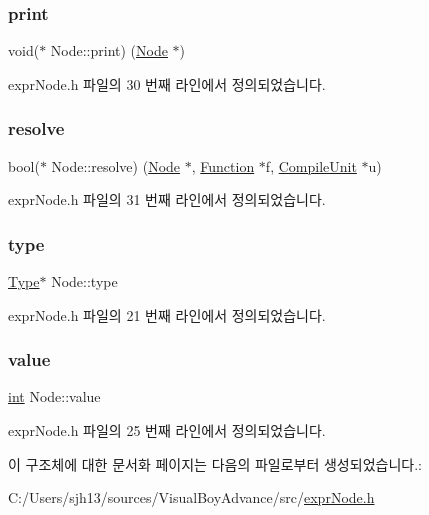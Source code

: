 \subsubsection{\texorpdfstring{print}{print}}
{\footnotesize\ttfamily void($\ast$ Node\+::print) (\mbox{\hyperlink{struct_node}{Node}} $\ast$)}



expr\+Node.\+h 파일의 30 번째 라인에서 정의되었습니다.

\mbox{\label{struct_node_a9d300576a9dcaf307b6c3b7da0d24ede}} 
\subsubsection{\texorpdfstring{resolve}{resolve}}
{\footnotesize\ttfamily bool($\ast$ Node\+::resolve) (\mbox{\hyperlink{struct_node}{Node}} $\ast$, \mbox{\hyperlink{struct_function}{Function}} $\ast$f, \mbox{\hyperlink{struct_compile_unit}{Compile\+Unit}} $\ast$u)}



expr\+Node.\+h 파일의 31 번째 라인에서 정의되었습니다.

\mbox{\label{struct_node_ae5bfe58e068d3ebbf9e5de3b9429ce78}} 
\subsubsection{\texorpdfstring{type}{type}}
{\footnotesize\ttfamily \mbox{\hyperlink{struct_type}{Type}}$\ast$ Node\+::type}



expr\+Node.\+h 파일의 21 번째 라인에서 정의되었습니다.

\mbox{\label{struct_node_aaa0cd30d78a90c5a6ab64eb3d58b8f87}} 
\subsubsection{\texorpdfstring{value}{value}}
{\footnotesize\ttfamily \mbox{\hyperlink{_util_8cpp_a0ef32aa8672df19503a49fab2d0c8071}{int}} Node\+::value}



expr\+Node.\+h 파일의 25 번째 라인에서 정의되었습니다.



이 구조체에 대한 문서화 페이지는 다음의 파일로부터 생성되었습니다.\+:\begin{DoxyCompactItemize}
\item 
C\+:/\+Users/sjh13/sources/\+Visual\+Boy\+Advance/src/\mbox{\hyperlink{expr_node_8h}{expr\+Node.\+h}}\end{DoxyCompactItemize}
